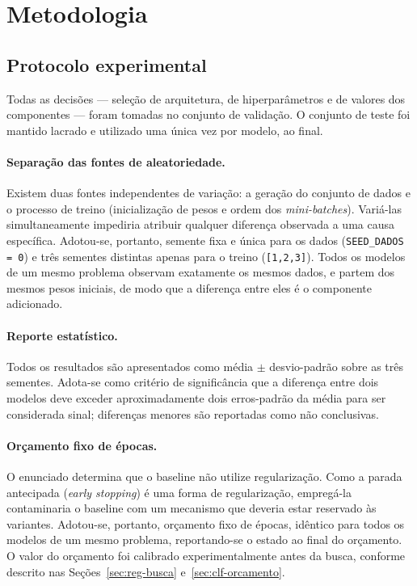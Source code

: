 \documentclass[11pt,a4paper]{article}
\begin{document}
\section{Metodologia}

\subsection{Protocolo experimental}

Todas as decisões --- seleção de arquitetura, de hiperparâmetros e de valores dos
componentes --- foram tomadas no conjunto de validação. O conjunto de teste foi mantido
lacrado e utilizado uma única vez por modelo, ao final.

\paragraph{Separação das fontes de aleatoriedade.} Existem duas fontes independentes de
variação: a geração do conjunto de dados e o processo de treino (inicialização de pesos
e ordem dos \emph{mini-batches}). Variá-las simultaneamente impediria atribuir qualquer
diferença observada a uma causa específica. Adotou-se, portanto, semente fixa e única
para os dados (\texttt{SEED\_DADOS = 0}) e três sementes distintas apenas para o treino
(\texttt{[1,2,3]}). Todos os modelos de um mesmo problema observam exatamente os mesmos
dados, e partem dos mesmos pesos iniciais, de modo que a diferença entre eles é o
componente adicionado.

\paragraph{Reporte estatístico.} Todos os resultados são apresentados como média $\pm$
desvio-padrão sobre as três sementes. Adota-se como critério de significância que a
diferença entre dois modelos deve exceder aproximadamente dois erros-padrão da média
para ser considerada sinal; diferenças menores são reportadas como não conclusivas.

\paragraph{Orçamento fixo de épocas.} O enunciado determina que o baseline não utilize
regularização. Como a parada antecipada (\emph{early stopping}) é uma forma de
regularização, empregá-la contaminaria o baseline com um mecanismo que deveria estar
reservado às variantes. Adotou-se, portanto, orçamento fixo de épocas, idêntico para
todos os modelos de um mesmo problema, reportando-se o estado ao final do orçamento.
O valor do orçamento foi calibrado experimentalmente antes da busca, conforme descrito
nas Seções~\ref{sec:reg-busca} e~\ref{sec:clf-orcamento}.
\end{document}
